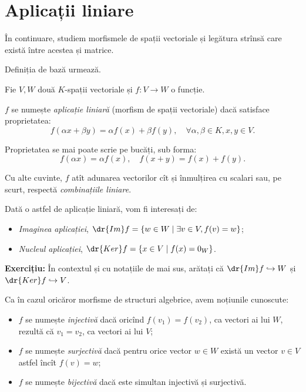 
\chapter{Aplicații liniare}

\indent\indent În continuare, studiem morfismele de spații vectoriale și legătura
strînsă care există între acestea și matrice.

Definiția de bază urmează.

\begin{definition}\label{def:apl-lin}
    Fie $ V, W $ două $ K $-spații vectoriale și $ f : V \to W $ o funcție.

    $ f $ se numește \emph{aplicație liniară} (morfism de spații vectoriale)
    dacă satisface proprietatea:
    \[
        f(\alpha x + \beta y) = \alpha f(x) + \beta f(y), \quad %
        \forall \alpha, \beta \in K, x, y \in V.
    \]
    
    Proprietatea se mai poate scrie pe bucăți, sub forma:
    \[
        f(\alpha x) = \alpha f(x), \quad f(x + y) = f(x) + f(y).
    \]
\end{definition}

Cu alte cuvinte, $ f $  atît adunarea vectorilor cît și înmulțirea
cu scalari sau, pe scurt, respectă \emph{combinațiile liniare}.

Dată o astfel de aplicație liniară, vom fi interesați de:
\begin{itemize} 
    \item \emph{Imaginea aplicației}, $ \dr{Im}f = \{ w \in W \mid \exists v \in V, f(v) = w \} $;
    \item \emph{Nucleul aplicației}, $ \dr{Ker}f = \{ x \in V \mid f(x) = 0_W \} $.
\end{itemize}

\textbf{Exercițiu:} În contextul și cu notațiile de mai sus, arătați că
$ \dr{Im}f \hookrightarrow W $ și $ \dr{Ker}f \hookrightarrow V $.

Ca în cazul oricăror morfisme de structuri algebrice, avem noțiunile cunoscute:
\begin{itemize}
    \item $ f $ se numește \emph{injectivă} dacă oricînd $ f(v_1) = f(v_2) $, ca vectori
        ai lui $ W $, rezultă că $ v_1 = v_2 $, ca vectori ai lui $ V $;
    \item $ f $ se numește \emph{surjectivă} dacă pentru orice vector $ w \in W $
        există un vector $ v \in V $ astfel încît $ f(v) = w $;
    \item $ f $ se numește \emph{bijectivă} dacă este simultan injectivă și
        surjectivă.
\end{itemize}

